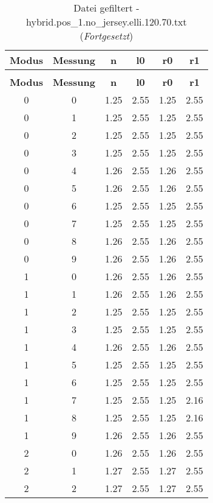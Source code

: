 \begin{longtable}{|c|c||c||c||c|c|}
	\caption{Datei gefiltert - hybrid.pos\_1.no\_jersey.elli.120.70.txt} \label{tab:hybrid.pos-1.no-jersey.elli.120.70.txt} \\ \hline
	\textbf{Modus} & \textbf{Messung} & \textbf{n} & \textbf{l0} & \textbf{r0} & \textbf{r1}\\ \hline
	\endfirsthead
	\caption[]{Datei gefiltert - hybrid.pos\_1.no\_jersey.elli.120.70.txt (\emph{Fortgesetzt})} \\ \hline
	\textbf{Modus} & \textbf{Messung} & \textbf{n} & \textbf{l0} & \textbf{r0} & \textbf{r1}\\ \hline
	\endhead
	0 & 0 & 1.25 & 2.55 & 1.25 & 2.55 \\ \hline
	0 & 1 & 1.25 & 2.55 & 1.25 & 2.55 \\ \hline
	0 & 2 & 1.25 & 2.55 & 1.25 & 2.55 \\ \hline
	0 & 3 & 1.25 & 2.55 & 1.25 & 2.55 \\ \hline
	0 & 4 & 1.26 & 2.55 & 1.26 & 2.55 \\ \hline
	0 & 5 & 1.26 & 2.55 & 1.26 & 2.55 \\ \hline
	0 & 6 & 1.25 & 2.55 & 1.25 & 2.55 \\ \hline
	0 & 7 & 1.25 & 2.55 & 1.25 & 2.55 \\ \hline
	0 & 8 & 1.26 & 2.55 & 1.26 & 2.55 \\ \hline
	0 & 9 & 1.26 & 2.55 & 1.26 & 2.55 \\ \hline
	1 & 0 & 1.26 & 2.55 & 1.26 & 2.55 \\ \hline
	1 & 1 & 1.26 & 2.55 & 1.26 & 2.55 \\ \hline
	1 & 2 & 1.25 & 2.55 & 1.25 & 2.55 \\ \hline
	1 & 3 & 1.25 & 2.55 & 1.25 & 2.55 \\ \hline
	1 & 4 & 1.26 & 2.55 & 1.26 & 2.55 \\ \hline
	1 & 5 & 1.25 & 2.55 & 1.25 & 2.55 \\ \hline
	1 & 6 & 1.25 & 2.55 & 1.25 & 2.55 \\ \hline
	1 & 7 & 1.25 & 2.55 & 1.25 & 2.16 \\ \hline
	1 & 8 & 1.25 & 2.55 & 1.25 & 2.16 \\ \hline
	1 & 9 & 1.26 & 2.55 & 1.26 & 2.55 \\ \hline
	2 & 0 & 1.26 & 2.55 & 1.26 & 2.55 \\ \hline
	2 & 1 & 1.27 & 2.55 & 1.27 & 2.55 \\ \hline
	2 & 2 & 1.27 & 2.55 & 1.27 & 2.55 \\ \hline

\end{longtable}
